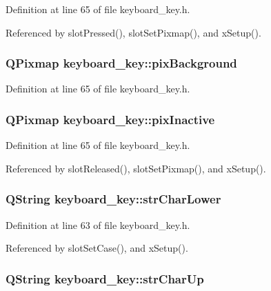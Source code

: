 Definition at line 65 of file keyboard\_\-key.h.

Referenced by slot\-Pressed(), slot\-Set\-Pixmap(), and x\-Setup().
\subsubsection{\setlength{\rightskip}{0pt plus 5cm}QPixmap {\bf keyboard\_\-key::pix\-Background}\hspace{0.3cm}{\tt  [private]}}\label{classkeyboard__key_keyboard__keyr4}




Definition at line 65 of file keyboard\_\-key.h.
\subsubsection{\setlength{\rightskip}{0pt plus 5cm}QPixmap {\bf keyboard\_\-key::pix\-Inactive}\hspace{0.3cm}{\tt  [private]}}\label{classkeyboard__key_keyboard__keyr6}




Definition at line 65 of file keyboard\_\-key.h.

Referenced by slot\-Released(), slot\-Set\-Pixmap(), and x\-Setup().
\subsubsection{\setlength{\rightskip}{0pt plus 5cm}QString {\bf keyboard\_\-key::str\-Char\-Lower}\hspace{0.3cm}{\tt  [private]}}\label{classkeyboard__key_keyboard__keyr2}




Definition at line 63 of file keyboard\_\-key.h.

Referenced by slot\-Set\-Case(), and x\-Setup().
\subsubsection{\setlength{\rightskip}{0pt plus 5cm}QString {\bf keyboard\_\-key::str\-Char\-Up}\hspace{0.3cm}{\tt  [private]}}\label{classkeyboard__key_keyboard__keyr1}




